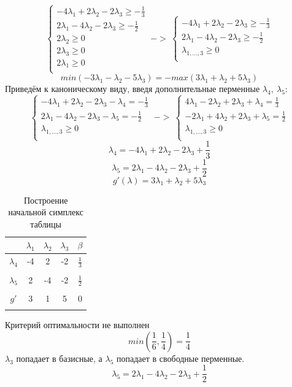 \documentclass{article}
\begin{document}
\[\begin{cases}
    -4\lambda_1 + 2\lambda_2 -2\lambda_3 \geq -\frac{1}{3}\\
    2\lambda_1 -4\lambda_2 -2\lambda_3 \geq -\frac{1}{2}\\
    2\lambda_2 \geq 0\\
    2\lambda_3 \geq 0\\
    2\lambda_1 \geq 0\\
\end{cases}\ ->\ 
\begin{cases}
    -4\lambda_1 + 2\lambda_2 -2\lambda_3 \geq -\frac{1}{3}\\
    2\lambda_1 -4\lambda_2 -2\lambda_3 \geq -\frac{1}{2}\\
    \lambda_{1, ..., 3} \geq 0\\
\end{cases}
\]
\[min(-3\lambda_1 - \lambda_2 - 5\lambda_3) = - max(3\lambda_1 + \lambda_2 + 5\lambda_3)\]
Приведём к каноническому виду, введя дополнительные перменные $\lambda_4,\ \lambda_5$:
\[
\begin{cases}
    -4\lambda_1 + 2\lambda_2 -2\lambda_3 - \lambda_4 = -\frac{1}{3}\\
    2\lambda_1 -4\lambda_2 -2\lambda_3 - \lambda_5 = -\frac{1}{2}\\
    \lambda_{1, ..., 3} \geq 0\\
\end{cases}
\ ->\ 
\begin{cases}
    4\lambda_1 - 2\lambda_2 + 2\lambda_3 + \lambda_4 = \frac{1}{3}\\
    - 2\lambda_1 + 4\lambda_2 + 2\lambda_3 + \lambda_5 = \frac{1}{2}\\
    \lambda_{1, ..., 3} \geq 0\\
\end{cases}
\]
\[\lambda_4 = -4\lambda_1 + 2\lambda_2 - 2\lambda_3 + \frac{1}{3}\]
\[ \lambda_5 =  2\lambda_1 - 4\lambda_2 - 2\lambda_3 +\frac{1}{2}\]
\[g'(\lambda) = 3\lambda_1 + \lambda_2 + 5\lambda_3\]

\begin{table}[H]
    \centering
    \caption{Построение начальной симплекс таблицы}
    \begin{tabular}{|c|c|c|c|c|}
    \hline
    &$\lambda_1$&$\lambda_2$&$\lambda_3$&$\beta$\\\hline
    $\lambda_4$&-4&2&-2&$\frac{1}{3}$\\
    &&&&\\\hline
    $\lambda_5$&2&-4&-2&$\frac{1}{2}$\\
    &&&&\\\hline
    $g'$&3&1&5&0\\
    &&&&\\\hline
    \end{tabular}
\end{table}
Критерий оптимальности не выполнен 
\[min(\frac{1}{6}, \frac{1}{4}) = \frac{1}{4}\]
 $\lambda_3$ попадает в базисные, а $\lambda_5$ попадает в свободные перменные.
\[\lambda_5 = 2\lambda_1 -4\lambda_2-2\lambda_3 +\frac{1}{2}\]
\end{document}
